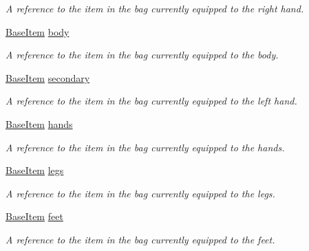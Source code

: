 \begin{DoxyCompactItemize}
\begin{DoxyCompactList}\small\item\em A reference to the item in the bag currently equipped to the right hand. \end{DoxyCompactList}\item 
\mbox{\hyperlink{class_base_item}{Base\+Item}} \mbox{\hyperlink{class_bag_a1c9c49018ee2e88c1fd09df3bd6d9d9f}{body}}
\begin{DoxyCompactList}\small\item\em A reference to the item in the bag currently equipped to the body. \end{DoxyCompactList}\item 
\mbox{\hyperlink{class_base_item}{Base\+Item}} \mbox{\hyperlink{class_bag_ad5d314d6b9a11127a8bdebc98f2a9cc0}{secondary}}
\begin{DoxyCompactList}\small\item\em A reference to the item in the bag currently equipped to the left hand. \end{DoxyCompactList}\item 
\mbox{\hyperlink{class_base_item}{Base\+Item}} \mbox{\hyperlink{class_bag_a19700ba62882ea2e03f954a6b4f267fa}{hands}}
\begin{DoxyCompactList}\small\item\em A reference to the item in the bag currently equipped to the hands. \end{DoxyCompactList}\item 
\mbox{\hyperlink{class_base_item}{Base\+Item}} \mbox{\hyperlink{class_bag_a06fc81d3974eb764db9be3fda8e63284}{legs}}
\begin{DoxyCompactList}\small\item\em A reference to the item in the bag currently equipped to the legs. \end{DoxyCompactList}\item 
\mbox{\hyperlink{class_base_item}{Base\+Item}} \mbox{\hyperlink{class_bag_a45172ef71e457ce9c818866fc0ffd5c2}{feet}}
\begin{DoxyCompactList}\small\item\em A reference to the item in the bag currently equipped to the feet. \end{DoxyCompactList}\end{DoxyCompactItemize}


